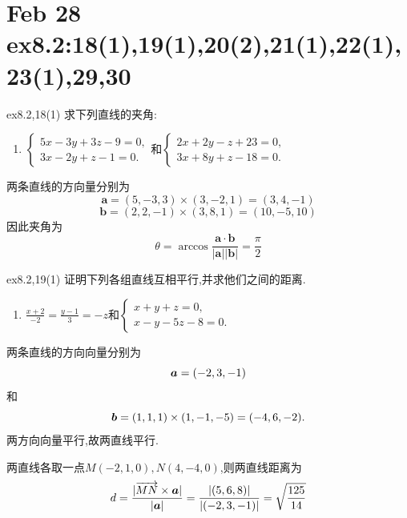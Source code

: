 \section{Feb 28 ex8.2:18(1),19(1),20(2),21(1),22(1),23(1),29,30}

\begin{exercise}{ex8.2,18(1)}
    求下列直线的夹角:
    \begin{enumerate}
        \item $\begin{cases}
            5x - 3y + 3z - 9 = 0,\\
            3x -2y + z -1 = 0.
        \end{cases}$和$\begin{cases}
            2x + 2y -z +23 =0,\\
            3x + 8y + z -18 = 0.
        \end{cases}$
    \end{enumerate}
\end{exercise}

\begin{solution}
    两条直线的方向量分别为
\[
\bm{a} = (5, -3, 3) \times (3, -2, 1) = (3, 4, -1)
\]
\[
\bm{b} = (2, 2, -1) \times (3, 8, 1) = (10, -5, 10)
\]
因此夹角为
\[
\theta = \arccos \frac{\bm{a} \cdot \bm{b}}{|\bm{a}| |\bm{b}|} = \frac{\pi}{2}
\]
\end{solution}

\begin{exercise}{ex8.2,19(1)}
    证明下列各组直线互相平行,并求他们之间的距离.
    \begin{enumerate}
        \item $\frac{x+2}{-2} = \frac{y-1}{3} = -z$和$\begin{cases}
            x+y+z = 0,\\
            x-y-5z-8=0.
        \end{cases}$
    \end{enumerate}
\end{exercise}

\begin{solution}
    两条直线的方向向量分别为
    $$\bm{a} = (-2,3,-1)$$和
    $$\bm{b} = (1,1,1) \times (1,-1,-5) = (-4,6,-2).$$ 
    两方向向量平行,故两直线平行.

    两直线各取一点$M(-2,1,0),N(4,-4,0)$,则两直线距离为
    $$
    d = \frac{|\overrightarrow{MN} \times \bm{a} |}{| \bm{a} |} = \frac{|(5,6,8)|}{|(-2,3,-1)|} = \sqrt{\frac{125}{14}}
    $$
\end{solution}

